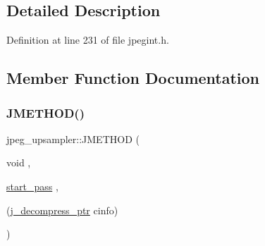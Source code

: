 \subsection{Detailed Description}


Definition at line 231 of file jpegint.\+h.



\subsection{Member Function Documentation}
\mbox{\label{structjpeg__upsampler_a01ac725bfe78e05e7671547504a95346}} 
\subsubsection{\texorpdfstring{JMETHOD()}{JMETHOD()}\hspace{0.1cm}{\footnotesize\ttfamily [1/2]}}
{\footnotesize\ttfamily jpeg\+\_\+upsampler\+::\+J\+M\+E\+T\+H\+OD (\begin{DoxyParamCaption}\item[{void}]{,  }\item[{\mbox{\hyperlink{jddctmgr_8c_a1964f006adb8fb80f57e455f6452aec1}{start\+\_\+pass}}}]{,  }\item[{(\mbox{\hyperlink{jpeglib_8h_a00c7d78af44bd26a901c791ccfc1e178}{j\+\_\+decompress\+\_\+ptr}} cinfo)}]{ }\end{DoxyParamCaption})}

\mbox{\label{structjpeg__upsampler_a23e9af5ee7259d39179063e3ece9fb8f}} 
